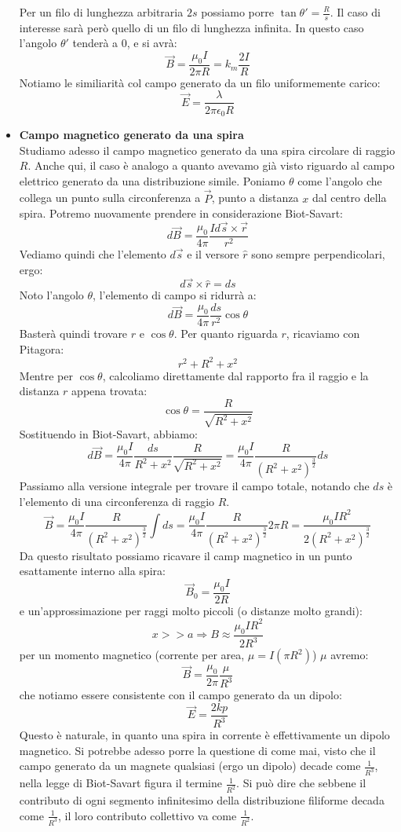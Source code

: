 \documentclass[a4paper,12pt]{article}
\begin{document}
\begin{itemize}
    Per un filo di lunghezza arbitraria $2s$ possiamo porre $\tan{\theta'} = \frac{R}{s}$. Il caso di interesse sarà però quello
    di un filo di lunghezza infinita. In questo caso l'angolo $\theta'$ tenderà a $0$, e si avrà:
    $$ \vec{B} = \frac{\mu_0I}{2\pi R} = k_m \frac{2I}{R}$$
    Notiamo le similiarità col campo generato da un filo uniformemente carico:
    $$ \vec{E} = \frac{\lambda}{2\pi\epsilon_0 R} $$
  \item \textbf{Campo magnetico generato da una spira} \\
    Studiamo adesso il campo magnetico generato da una spira circolare di raggio $R$. Anche qui, il caso è analogo a quanto avevamo già visto riguardo
    al campo elettrico generato da una distribuzione simile. Poniamo $\theta$ come l'angolo che collega un punto sulla circonferenza a $\vec{P}$, punto a distanza
    $x$ dal centro della spira. Potremo nuovamente prendere in considerazione Biot-Savart:
    $$ d\vec{B} = \frac{\mu_0}{4\pi} \frac{Id\vec{s} \times \vec{r}}{r^2} $$
    Vediamo quindi che l'elemento $d\vec{s}$ e il versore $\hat{r}$ sono sempre perpendicolari, ergo:
    $$ d\vec{s} \times \hat{r} = ds $$
    Noto l'angolo $\theta$, l'elemento di campo si ridurrà a:
    $$ d\vec{B} = \frac{\mu_0}{4\pi} \frac{ds}{r^2}\cos{\theta} $$
    Basterà quindi trovare $r$ e $\cos{\theta}$. Per quanto riguarda $r$, ricaviamo con Pitagora:
    $$ r^2 + R^2 + x^2 $$
    Mentre per $\cos{\theta}$, calcoliamo direttamente dal rapporto fra il raggio e la distanza $r$ appena trovata:
    $$ \cos{\theta} = \frac{R}{\sqrt{R^2 + x^2}} $$
    Sostituendo in Biot-Savart, abbiamo:
    $$ d\vec{B} = \frac{\mu_0 I}{4\pi} \frac{ds}{R^2 + x^2} \frac{R}{\sqrt{R^2+x^2}} = \frac{\mu_0I}{4\pi} \frac{R}{(R^2+x^2)^{\frac{3}{2}}}ds $$
    Passiamo alla versione integrale per trovare il campo totale, notando che $ds$ è l'elemento di una circonferenza di raggio $R$.
    $$ \vec{B} = \frac{\mu_0I}{4\pi} \frac{R}{(R^2+x^2)^{\frac{3}{2}}}\int ds = \frac{\mu_0I}{4\pi} \frac{R}{(R^2+x^2)^{\frac{3}{2}}} 2\pi R = \frac{\mu_0IR^2}{2(R^2+x^2)^{\frac{3}{2}}} $$
    Da questo risultato possiamo ricavare il camp magnetico in un punto esattamente interno alla spira:
    $$ \vec{B}_0 = \frac{\mu_0I}{2R} $$
    e un'approssimazione per raggi molto piccoli (o distanze molto grandi):
    $$ x >> a \Rightarrow B \approx \frac{\mu_0IR^2}{2R^3} $$
    per un momento magnetico (corrente per area, $\mu = I(\pi R^2)$) $\mu$ avremo:
    $$ \vec{B} = \frac{\mu_0}{2\pi} \frac{\mu}{R^3}$$
    che notiamo essere consistente con il campo generato da un dipolo:
    $$ \vec{E} = \frac{2kp}{R^3} $$
    Questo è naturale, in quanto una spira in corrente è effettivamente un dipolo magnetico. Si potrebbe
    adesso porre la questione di come mai, visto che il campo generato da un magnete qualsiasi (ergo un dipolo) decade
    come $\frac{1}{R^3}$, nella legge di Biot-Savart figura il termine $\frac{1}{R^2}$. Si può dire che sebbene il contributo
    di ogni segmento infinitesimo della distribuzione filiforme decada come $\frac{1}{R^3}$, il loro contributo collettivo va
    come $\frac{1}{R^2}$.
\end{itemize} 
\end{document}
